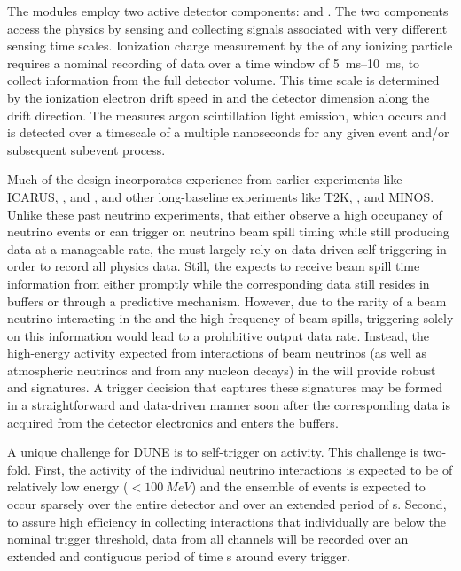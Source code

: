 The   modules employ two
active detector components:  and . The two components access the physics %
by sensing and collecting signals associated with very different 
sensing time scales.
Ionization charge measurement by the  of any ionizing particle requires a
nominal recording of data over a time window of
\SIrange{5}{10}{\milli\second},
to collect information from the full detector volume. 
This time scale is determined by the ionization electron drift speed in
\lar and the detector dimension along the drift direction.
The  measures argon scintillation light emission, which
occurs and is detected over a timescale of a multiple nanoseconds for
any given event and/or subsequent subevent process. 
 
Much of the  design incorporates experience from earlier
 experiments like ICARUS, \microboone, and
, and other long-baseline experiments like T2K, \nova,
and MINOS. 
Unlike these past neutrino experiments, that either observe a
high occupancy of neutrino events or  can trigger on neutrino beam
spill timing while still producing data at a manageable rate, the
   must largely rely on data-driven
self-triggering in order to record all physics data. 
Still, the  expects to receive beam spill time information from
\fnal either promptly while the corresponding data still resides in
buffers or through a predictive mechanism. 
However, due to the rarity of a beam neutrino interacting in the
 and the high frequency of beam spills, triggering solely on
this information would lead to a prohibitive output data rate.
Instead, the high-energy activity expected from interactions of beam neutrinos
(as well as atmospheric neutrinos and from any nucleon decays) in the
  will provide robust  and 
signatures.
A trigger decision that captures these signatures may be formed in a
straightforward and data-driven manner soon after the corresponding data
is acquired from the detector electronics and enters the  buffers.

A unique 
challenge for DUNE is to self-trigger on  activity.
This challenge is two-fold. 
First, the activity of the individual  neutrino interactions
is expected to be of relatively low energy ($<\SI{100}{MeV}$) and the
ensemble of  events is expected to occur sparsely over the
entire detector and over an extended period of \si{s}. 
Second, to assure high efficiency in collecting  interactions
that individually are below the nominal trigger threshold, data from
all channels will be recorded over an extended and contiguous period of
time \si{s} around every  trigger.

